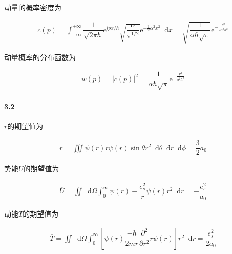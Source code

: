 \documentclass{article}
\newcommand*{\md}{\mathop{}\!\mathrm{d}}
\newcommand*{\me}{\mathrm{e}}
\begin{document}
动量的概率密度为

\begin{equation*}
  \begin{aligned}
    c \left( p \right) = \int_{-\infty}^{+\infty} \dfrac{1}{\sqrt{2\pi \hbar}} \me^{ipx/h} \sqrt{\dfrac{\alpha}{\pi^{1/2}} } \me^{- \frac{1}{2} \alpha^2 x^2} \md x = \sqrt{\dfrac{1}{\alpha \hbar \sqrt{\pi}} } \me^{- \frac{p^2}{2 \alpha^2 \hbar^2} } 
  \end{aligned}
\end{equation*}

动量概率的分布函数为

\begin{equation*}
  \begin{aligned}
    w \left( p \right) = \left| c \left( p \right) \right|^2 = \dfrac{1}{\alpha \hbar \sqrt{\pi}} \me^{- \frac{p^2}{\alpha^2 \hbar^2} } 
  \end{aligned}
\end{equation*}

\paragraph{3.2}

$r$的期望值为

\begin{equation*}
  \begin{aligned}
    \overline{r} = \iiint \psi \left( r \right) r \psi \left( r \right) \sin \theta r ^2 \md \theta \md r \md \phi = \dfrac{3}{2} a_0 
  \end{aligned}
\end{equation*}

势能$U$的期望值为

\begin{equation*}
  \begin{aligned}
    \overline{U} = \iint \md \Omega \int_0^{\infty} \psi \left( r \right) - \dfrac{e_s^2}{r} \psi \left( r \right) r^2 \md r = - \dfrac{e_s^2}{a_0} 
  \end{aligned}
\end{equation*}

动能$T$的期望值为

\begin{equation*}
  \begin{aligned}
    \overline{T} = \iint \md \Omega \int_0^{\infty} \left[ \psi \left( r \right) \dfrac{- \hbar}{2mr} \dfrac{\partial^2 }{\partial r^2} r \psi \left( r \right)   \right] r^2 \md r = \dfrac{e_s^2}{2 a_0} 
  \end{aligned}
\end{equation*}
\end{document}
